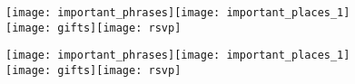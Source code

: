 \documentclass[6pt]{article}
\begin{document}
\pagestyle{empty}

\noindent\texttt{[image: important\_phrases]}\texttt{[image: important\_places\_1]}\\
\texttt{[image: gifts]}\texttt{[image: rsvp]}

\newpage

\noindent\texttt{[image: important\_phrases]}\texttt{[image: important\_places\_1]}\\
\texttt{[image: gifts]}\texttt{[image: rsvp]}
\end{document}
